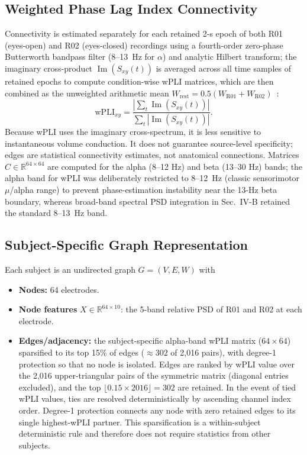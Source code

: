 \documentclass{ieeeaccess}
\begin{document}
\subsection{Weighted Phase Lag Index Connectivity}

Connectivity is estimated separately for each retained 2-s epoch of both R01 (eyes-open) and R02 (eyes-closed) recordings using a fourth-order zero-phase Butterworth bandpass filter (8--13~Hz for $\alpha$) and analytic Hilbert transform; the imaginary cross-product $\operatorname{Im}(S_{xy}(t))$ is averaged across all time samples of retained epochs to compute condition-wise wPLI matrices, which are then combined as the unweighted arithmetic mean $W_{\text{rest}} = 0.5 (W_{\text{R01}} + W_{\text{R02}})$~\cite{vinck2011}:
\begin{equation}
\mathrm{wPLI}_{xy} = \frac{\left| \sum_{t} \operatorname{Im}(S_{xy}(t)) \right|}{\sum_{t} \left| \operatorname{Im}(S_{xy}(t)) \right|} .
\end{equation}
Because wPLI uses the imaginary cross-spectrum, it is less sensitive to instantaneous volume conduction. It does not guarantee source-level specificity; edges are statistical connectivity estimates, not anatomical connections. Matrices $C\in\mathbb{R}^{64\times64}$ are computed for the alpha (8--12 Hz) and beta (13--30 Hz) bands; the alpha band for wPLI was deliberately restricted to 8--12~Hz (classic sensorimotor $\mu$/alpha range) to prevent phase-estimation instability near the 13-Hz beta boundary, whereas broad-band spectral PSD integration in Sec.~IV-B retained the standard 8--13~Hz band.

\subsection{Subject-Specific Graph Representation}

Each subject is an undirected graph $G=(V,E,W)$ with
\begin{itemize}[leftmargin=*]
    \item \textbf{Nodes:} 64 electrodes.
    \item \textbf{Node features} $X\in\mathbb{R}^{64\times10}$: the 5-band relative PSD of R01 and R02 at each electrode.
    \item \textbf{Edges/adjacency:} the subject-specific alpha-band wPLI matrix ($64\times64$) sparsified to its top 15\% of edges ($\approx 302$ of 2,016 pairs), with degree-1 protection so that no node is isolated. Edges are ranked by wPLI value over the 2,016 upper-triangular pairs of the symmetric matrix (diagonal entries excluded), and the top $\lfloor0.15\times2016\rfloor=302$ are retained. In the event of tied wPLI values, ties are resolved deterministically by ascending channel index order. Degree-1 protection connects any node with zero retained edges to its single highest-wPLI partner. This sparsification is a within-subject deterministic rule and therefore does not require statistics from other subjects.
\end{itemize}
\end{document}
